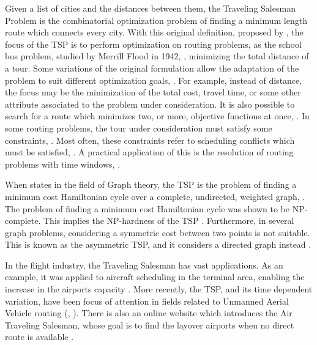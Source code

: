 Given a list of cities and the distances between them, the Traveling Salesman Problem is the combinatorial optimization problem of finding a minimum length route which connects every city. With this original definition, proposed by \cite{cite_1}, the focus of the TSP is to perform optimization on routing problems, as the school bus problem, studied by Merrill Flood in 1942, \cite{cite_2}, minimizing the total distance of a tour. Some variations of the original formulation allow the adaptation of the problem to suit different optimization goals, \cite{cite_3}. For example, instead of distance, the focus may be the minimization of the total cost, travel time, or some other attribute associated to the problem under consideration. It is also possible to search for a route which minimizes two, or more, objective functions at once, \cite{cite_4}.  In some routing problems, the tour under consideration must satisfy some constraints, \cite{cite_8}. Most often, these constraints refer to scheduling conflicts which must be satisfied, \cite{cite_9}. A practical application of this is the resolution of routing problems with time windows, \cite{cite_10}.

When states in the field of Graph theory, the TSP is the problem of finding a minimum cost Hamiltonian cycle over a complete, undirected, weighted graph, \cite{cite_5}. The problem of finding a minimum cost Hamiltonian cycle was shown to be NP-complete. This implies the NP-hardness of the TSP \cite{cite_6}. Furthermore, in several graph problems, considering a symmetric cost between two points is not suitable. This is known as the asymmetric TSP, and it considers a directed graph instead \cite{cite_7}.

In the flight industry, the Traveling Salesman has vast applications. As an example, it was applied to aircraft scheduling in the terminal area, enabling the increase in the airports capacity \cite{cite_14}. More recently, the TSP, and its time dependent variation, have been focus of attention in fields related to Unmanned Aerial Vehicle routing (\cite{cite_16}, \cite{cite_17}). There is also an online website which introduces the Air Traveling Salesman, whose goal is to find the layover airports when no direct route is available \cite{cite_15}.

